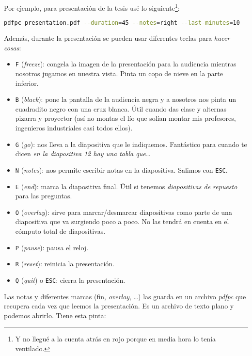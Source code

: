 Por ejemplo, para presentación de la tesis usé lo siguiente\footnote{Y
  no llegué a la cuenta atrás en rojo porque en media hora lo tenía
  ventilado.}:

\begin{lstlisting}[language=bash]
pdfpc presentation.pdf --duration=45 --notes=right --last-minutes=10
\end{lstlisting}

Además, durante la presentación se pueden usar diferentes teclas para
\emph{hacer cosas}:

\begin{itemize}
\item
  \lstinline!F! (\emph{freeze}): congela la imagen de la presentación
  para la audiencia mientras nosotros jugamos en nuestra vista. Pinta un
  copo de nieve en la parte inferior.
\item
  \lstinline!B! (\emph{black}): pone la pantalla de la audiencia negra y
  a nosotros nos pinta un cuadradito negro con una cruz blanca. Útil
  cuando das clase y alternas pizarra y proyector (así no montas el lío
  que solían montar mis profesores, ingenieros industriales casi todos
  ellos).
\item
  \lstinline!G! (\emph{go}): nos lleva a la diapositiva que le
  indiquemos. Fantástico para cuando te dicen \emph{en la diapositiva 12
  hay una tabla que\ldots{}}
\item
  \lstinline!N! (\emph{notes}): nos permite escribir notas en la
  diapositiva. Salimos con \lstinline!ESC!.
\item
  \lstinline!E! (\emph{end}): marca la diapositiva final. Útil si
  tenemos \emph{diapositivas de repuesto} para las preguntas.
\item
  \lstinline!O! (\emph{overlay}): sirve para marcar/desmarcar
  diapositivas como parte de una diapositiva que va surgiendo poco a
  poco. No las tendrá en cuenta en el cómputo total de diapositivas.
\item
  \lstinline!P! (\emph{pause}): pausa el reloj.
\item
  \lstinline!R! (\emph{reset}): reinicia la presentación.
\item
  \lstinline!Q! (\emph{quit}) o \lstinline!ESC!: cierra la presentación.
\end{itemize}

Las notas y diferentes marcas (fin, \emph{overlay}, \ldots{}) las guarda
en un archivo \emph{pdfpc} que recupera cada vez que leemos la
presentación. Es un archivo de texto plano y podemos abrirlo. Tiene esta
pinta:

